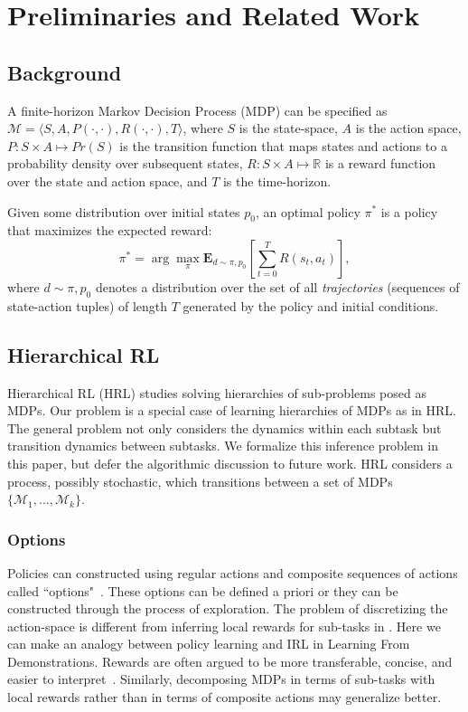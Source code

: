 %
\section{Preliminaries and Related Work}

\subsection{Background}\label{sec:back}
A finite-horizon Markov Decision Process (MDP) can be specified as $\mathcal{M} = \langle S,A,P(\cdot,\cdot), R(\cdot,\cdot),T \rangle$, where $S$ is the state-space, $A$ is the action space, $P: S \times A \mapsto Pr(S)$ is the transition function that maps states and actions to a probability density over subsequent states, $R: S \times A \mapsto \mathbb{R}$ is a reward function over the state and action space, and $T$ is the time-horizon.

Given some distribution over initial states $p_0$, an optimal policy $\pi^*$ is a policy that maximizes the expected reward:
\[
\pi^* = \arg\max_{\pi} \mathbf{E}_{d \sim \pi, p_0} [\sum_{t=0}^T R(s_t,a_t)],
\]
where $d \sim \pi, p_0$ denotes a distribution over the set of all \emph{trajectories} (sequences of state-action tuples) of length $T$ generated by the policy and initial conditions.

\subsection{Hierarchical RL}
Hierarchical RL (HRL) studies solving hierarchies of sub-problems posed as MDPs.
Our problem is a special case of learning hierarchies of MDPs as in HRL. 
The general problem not only considers the dynamics within each subtask but transition dynamics between subtasks.
We formalize this inference problem in this paper, but defer the algorithmic discussion to future work.
HRL considers a process, possibly stochastic, which transitions between a set of MDPs $\{\mathcal{M}_1,...,\mathcal{M}_k\}$. 

\subsubsection{Options}
Policies can constructed using regular actions and composite sequences of actions called ``options"~\cite{csimcsek2004using,menache2002q,mcgovern2001automatic}. These options can be defined a priori or they can be constructed through the process of exploration. 
The problem of discretizing the action-space is different from inferring local rewards for sub-tasks in \hirl.
Here we can make an analogy between policy learning and IRL in Learning From Demonstrations. Rewards are often argued to be more transferable, concise, and easier to interpret~\cite{DBLP:conf/icml/NgHR99}.
Similarly, decomposing MDPs in terms of sub-tasks with local rewards rather than in terms of composite actions may generalize better.

